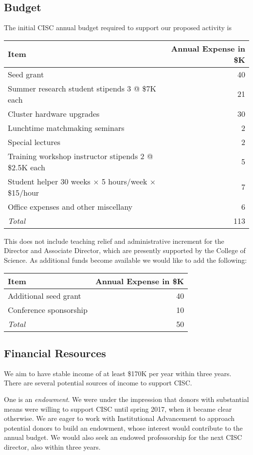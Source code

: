 \documentclass[12pt]{amsart}
\begin{document}
\subsection*{Budget}
The initial CISC annual budget required to support our proposed activity is 
\begin{center}
    \begin{tabular}{p{}@{\qquad} r}
\textbf{Item} & \textbf{Annual Expense in \$K} \\
\toprule
    Seed grant  & 40 \\
    Summer research student stipends 3 @ \$7K each & 21 \\
    Cluster hardware upgrades & 30 \\
    Lunchtime matchmaking seminars & 2 \\
    Special lectures & 2 \\
    Training workshop instructor stipends 2 @ \$2.5K each & 5\\
    Student helper 30 weeks $\times$ 5 hours/week $\times$ \$15/hour & 7 \\
    Office expenses and other miscellany & 6 \\
    \bottomrule
    \emph{Total} & 113
\end{tabular}
\end{center}
This does not include teaching relief and administrative increment for the Director and Associate Director, which are presently supported by the College of Science.  As additional funds become available we would like to add the following:
\begin{center}
    \begin{tabular}{p{}@{\qquad} r}
\textbf{Item} & \textbf{Annual Expense in \$K} \\
\toprule
    Additional seed grant  & 40 \\
    Conference sponsorship & 10 \\
    \bottomrule
    \emph{Total} & 50
\end{tabular}
\end{center}

\subsection*{Financial Resources}
We aim to have stable income of at least \$170K per year within three years.
There are several potential sources of income to support CISC.  

One is an \emph{endowment}.  We were under the impression that donors with substantial means were willing to support CISC until spring 2017, when it became clear otherwise.  We are eager to work with Institutional Advancement to approach potential donors to build an endowment, whose interest would contribute to the annual budget.  We would also seek an endowed professorship for the next CISC director, also within three years.
\end{document}
